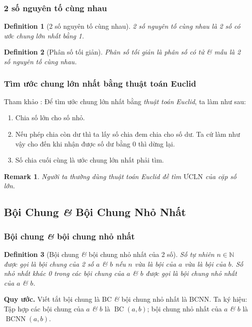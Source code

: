 \documentclass{article}
\numberwithin{equation}{section}
\newtheorem{definition}{Definition}[section]
\newtheorem{remark}{Remark}[section]
\begin{document}
\subsubsection{2 số nguyên tố cùng nhau}

\begin{definition}[2 số nguyên tố cùng nhau]
	\emph{2 số nguyên tố cùng nhau} là 2 số có ước chung lớn nhất bằng 1.
\end{definition}

\begin{definition}[Phân số tối giản]
	\emph{Phân số tối giản} là phân số có tử \textit{\&} mẫu là 2 số nguyên tố cùng nhau.
\end{definition}

\subsubsection{Tìm ước chung lớn nhất bằng thuật toán Euclid}
Tham khảo \cite[p. 52]{Thai_Anh_Dat_Ha_Loan_Nam_Quang_Toan_6_tap_1}: Để tìm ước chung lớn nhất bằng \textit{thuật toán Euclid}, ta làm như sau:
\begin{enumerate}
	\item Chia số lớn cho số nhỏ.
	\item Nếu phép chia còn dư thì ta lấy số chia đem chia cho số dư. Ta cứ làm như vậy cho đến khi nhận được số dư bằng 0 thì dừng lại.
	\item Số chia cuối cùng là ước chung lớn nhất phải tìm.
\end{enumerate}

\begin{remark}
	Người ta thường dùng thuật toán Euclid đề tìm $\mbox{ƯCLN}$ của cặp số lớn.
\end{remark}

\subsection{Bội Chung \textit{\&} Bội Chung Nhỏ Nhất}

\subsubsection{Bội chung \textit{\&} bội chung nhỏ nhất}

\begin{definition}[Bội chung \textit{\&} bội chung nhỏ nhất của 2 số]
	Số tự nhiên $n\in\mathbb{N}$ được gọi là \emph{bội chung} của 2 số $a$ \textit{\&} $b$ nếu $n$ vừa là bội của $a$ vừa là bội của $b$. Số nhỏ nhất khác 0 trong các bội chung của $a$ \textit{\&} $b$ được gọi là \emph{bội chung nhỏ nhất} của $a$ \textit{\&} $b$.
\end{definition}
\noindent\textbf{Quy ước.} Viết tắt bội chung là BC \textit{\&} bội chung nhỏ nhất là BCNN. Ta ký hiệu: Tập hợp các bội chung của $a$ \textit{\&} $b$ là $\operatorname{BC}(a,b)$; bội chung nhỏ nhất của $a$ \textit{\&} $b$ là $\operatorname{BCNN}(a,b)$.  
\end{document}
